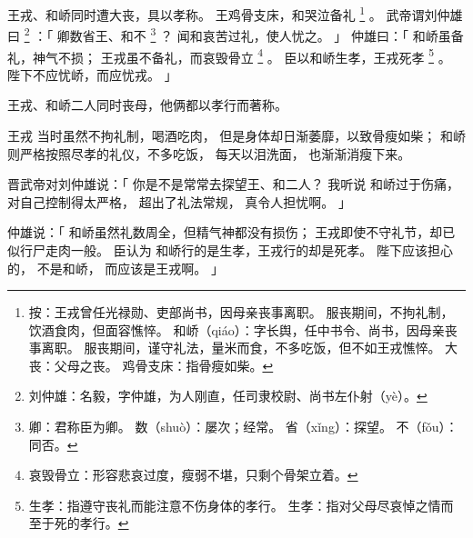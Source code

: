 
\switchcolumn*[\section{}]

王戎、和峤同时遭大丧，具以孝称。
王鸡骨支床，和哭泣备礼%
\footnote{%
    按：王戎曾任光禄勋、吏部尚书，因母亲丧事离职。
        服丧期间，不拘礼制，饮酒食肉，但面容憔悴。
    和峤（qiáo）：字长舆，任中书令、尚书，因母亲丧事离职。
                  服丧期间，谨守礼法，量米而食，不多吃饭，但不如王戎憔悴。
    大丧：父母之丧。
    鸡骨支床：指骨瘦如柴。
}%
。
武帝谓刘仲雄曰%
\footnote{%
    刘仲雄：名毅，字仲雄，为人刚直，任司隶校尉、尚书左仆射（yè）。
}%
：「
    卿数省王、和不%
    \footnote{%
        卿：君称臣为卿。
        数（shuò）：屡次；经常。
        省（xǐng）：探望。
        不（fǒu）：同否。
    }%
    ？
    闻和哀苦过礼，使人忧之。
」
仲雄曰：「
    和峤虽备礼，神气不损；
    王戎虽不备礼，而哀毁骨立%
    \footnote{%
        哀毁骨立：形容悲哀过度，瘦弱不堪，只剩个骨架立着。
    }%
    。
    臣以和峤生孝，王戎死孝%
    \footnote{%
        生孝：指遵守丧礼而能注意不伤身体的孝行。
        生孝：指对父母尽哀悼之情而至于死的孝行。
    }%
    。
    陛下不应忧峤，而应忧戎。
」

\switchcolumn

王戎、和峤二人同时丧母，他俩都以孝行而著称。

王戎
当时虽然不拘礼制，喝酒吃肉，
但是身体却日渐萎靡，以致骨瘦如柴；
和峤
则严格按照尽孝的礼仪，不多吃饭，
每天以泪洗面，
也渐渐消瘦下来。

晋武帝对刘仲雄说：「
    你是不是常常去探望王、和二人？
    我听说
    和峤过于伤痛，
    对自己控制得太严格，
    超出了礼法常规，
    真令人担忧啊。
」

仲雄说：「
    和峤虽然礼数周全，但精气神都没有损伤；
    王戎即使不守礼节，却已似行尸走肉一般。
    臣认为
    和峤行的是生孝，王戎行的却是死孝。
    陛下应该担心的，
    不是和峤，
    而应该是王戎啊。
」

